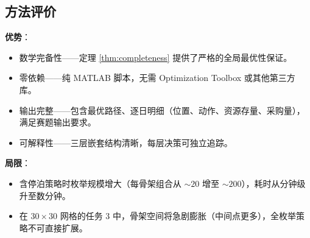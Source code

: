 \documentclass[12pt,a4paper]{ctexart}
\theoremstyle{definition}
\begin{document}
\subsection{方法评价}

\textbf{优势}：
\begin{itemize}
  \item 数学完备性——定理 \ref{thm:completeness} 提供了严格的全局最优性保证。
  \item 零依赖——纯 MATLAB 脚本，无需 Optimization Toolbox 或其他第三方库。
  \item 输出完整——包含最优路径、逐日明细（位置、动作、资源存量、采购量），满足赛题输出要求。
  \item 可解释性——三层嵌套结构清晰，每层决策可独立追踪。
\end{itemize}

\textbf{局限}：
\begin{itemize}
  \item 含停泊策略时枚举规模增大（每骨架组合从 $\sim 20$ 增至 $\sim 200$），耗时从分钟级升至数分钟。
  \item 在 $30\times 30$ 网格的任务 3 中，骨架空间将急剧膨胀（中间点更多），全枚举策略不可直接扩展。
\end{itemize}
\end{document}
